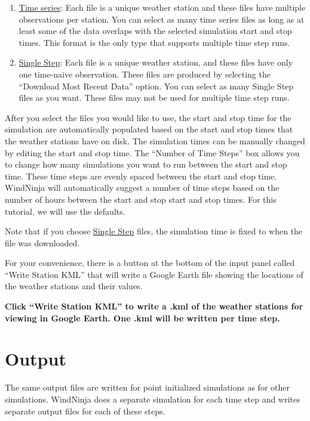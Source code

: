 \documentclass[12pt]{article}
\begin{document}
\begin{enumerate}
\item\underline{Time series}: Each file is a unique weather station and these files have multiple observations per station. 
You can select as many time series files as long as at least some of the data overlaps with the selected simulation start and stop times. 
This format is the only type that supports multiple time step runs.
\item\underline{Single Step}: Each file is a unique weather station, and these files have only one time-naive observation. 
These files are produced by selecting the “Download Most Recent Data” option. You can select as many Single Step  files as you want. 
These files may not be used for multiple time step runs.
\end{enumerate}

After you select the files you would like to use, the start and stop time for the simulation are automatically populated based on the start and stop times that the weather stations have on disk. 
The simulation times can be manually changed by editing the start and stop time. 
The “Number of Time Steps” box allows you to change how many simulations you want to run between the start and stop time. 
These time steps are evenly spaced between the start and stop time.  
WindNinja will automatically suggest a number of time steps based on the number of hours between the start and stop start and stop times.  
For this tutorial, we will use the defaults.

Note that if you choose \underline{Single Step} files, the simulation time is fixed to when the file was downloaded. 

For your convenience, there is a button at the bottom of the input panel called “Write Station KML” that will write a Google Earth file showing the locations of the weather stations and their values.

\textbf{\color{red} Click “Write Station KML” to write a .kml of the weather stations for viewing in Google Earth. One .kml will be written per time step.}

\section{Output}

The same output files are written for point initialized simulations as for other simulations. 
WindNinja does a separate simulation for each time step and writes separate output files for each of these steps.
\end{document}
